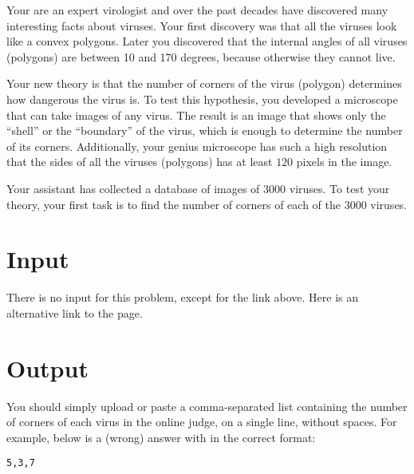 Your are an expert virologist and over the past decades have discovered many interesting facts about viruses.
Your first discovery was that all the viruses look like a convex polygons.
Later you discovered that the internal angles of all viruses (polygons) are between 10 and 170 degrees, because otherwise they cannot live.

Your new theory is that the number of corners of the virus (polygon) determines how dangerous the virus is.
To test this hypothesis, you developed a microscope that can take images of any virus.
The result is an image that shows only the ``shell'' or the ``boundary'' of the virus, which is enough to determine the number of its corners.
Additionally, your genius microscope has such a high resolution that the sides of all the viruses (polygons) has at least $120$ pixels in the image.

Your assistant has collected a database of images of $3000$ viruses.
To test your theory, your first task is to find the number of corners of each of the $3000$ viruses.

\section*{Input}
There is no input for this problem, except for the link above.
Here is an alternative link to the page.

\section*{Output}
You should simply upload or paste a comma-separated list containing the number of corners of each virus in the online judge, on a single line, without spaces.
For example, below is a (wrong) answer with in the correct format:
\begin{center}
    \texttt{5,3,7}
\end{center}

%
%
%
